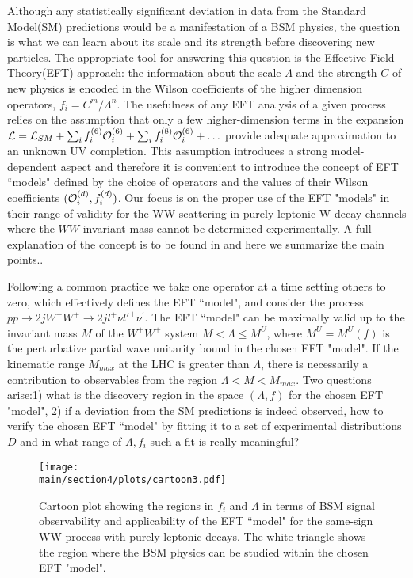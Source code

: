 
Although any statistically significant deviation in data from the  Standard Model(SM) predictions would be a manifestation of a BSM physics, the question is what we can learn about its scale and its strength before discovering new particles. The appropriate tool for answering this question is the Effective Field Theory(EFT) approach: the information about the  scale $\Lambda$ and the strength $C$ of new physics is encoded in  the Wilson coefficients of the higher dimension operators, $f_i=C^m/\Lambda^n$.
The usefulness of any EFT analysis of a given process relies on the assumption that only a few higher-dimension terms 
in the expansion ${\cal L}={\cal L}_{SM}+\sum_i f_i^{(6)}{\cal O}_i^{(6)}+ \sum_i f_i^{(8)}{\cal O}_i^{(6)}+\ldots$ 
provide adequate approximation to an unknown UV completion.   
This assumption  introduces a strong model-dependent aspect and therefore it is convenient to introduce the concept of EFT ``models" defined by the choice of operators  and the values of their Wilson coefficients $({\cal O}_i^{(d)},f_i^{(d)})$.  Our focus is on the proper use of the EFT "models" in their range of validity for the WW scattering in purely leptonic W decay channels where the $WW$ invariant mass cannot be determined experimentally. A full explanation of the concept is to be found in  \cite{Kalinowski:2018oxd} and here we summarize the main points..



Following a common practice we take one operator at a time setting others to 
zero,  which effectively defines the EFT ``model", 
and consider   the process 
$pp\rightarrow 2jW^+ W^+ \rightarrow 2j l^+\nu l'^+\nu^\prime$. 
The EFT ``model" can be maximally valid up to the invariant mass $M$ of the 
$W^+W^+$ system 
$M<\Lambda\leq M^U$, where $M^U=M^U(f)$ is the perturbative partial wave unitarity bound  in the chosen EFT "model".  
If  the kinematic range $M_{max}$  at the LHC is greater than $\Lambda$, there is necessarily a 
contribution to observables from the region $\Lambda < M < M_{max}$.  
Two questions arise:1) what is the discovery region in the space $(\Lambda, f)$ for the chosen EFT "model", 2) if a deviation from  the SM predictions is indeed observed,
how to verify the chosen EFT  ``model"  by fitting it to a set of experimental distributions $D$ 
and in what range of $\Lambda, f_i$ such a fit is really meaningful?
%
%
\begin{figure}
\texttt{[image: \\main/section4/plots/cartoon3.pdf]}
\caption{
Cartoon plot showing the regions in $f_i$ and $\Lambda$ in terms of BSM signal observability
and applicability of the EFT ``model"  for  the same-sign WW process with purely 
leptonic decays.  The white triangle shows the region
where the BSM physics can be studied within the chosen EFT "model".}
\label{fig:cartoonplot}
\end{figure}
%

